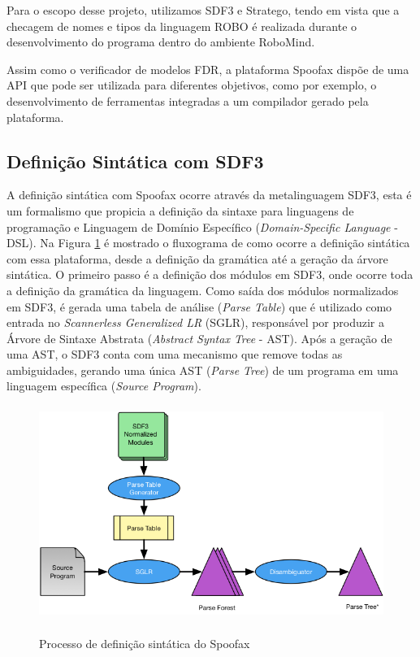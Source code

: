 Para o escopo desse projeto, utilizamos SDF3 e Stratego, tendo em vista que a checagem de nomes e tipos da linguagem ROBO é realizada durante o desenvolvimento do programa dentro do ambiente RoboMind. 

Assim como o verificador de modelos FDR, a plataforma Spoofax dispõe de uma API que pode ser utilizada para diferentes objetivos, como por exemplo, o desenvolvimento de ferramentas integradas a um compilador gerado pela plataforma.

\subsection{Definição Sintática com SDF3}

A definição sintática com Spoofax ocorre através da metalinguagem SDF3, esta é um formalismo que propicia a definição da sintaxe para linguagens de programação e Linguagem de Domínio Específico (\textit{Domain-Specific Language} - DSL). Na Figura \ref{fig:parsing} é mostrado o fluxograma de como ocorre a definição sintática com essa plataforma, desde a definição da gramática até a geração da árvore sintática. O primeiro passo é a definição dos módulos em SDF3, onde ocorre toda a definição da gramática da linguagem. Como saída dos módulos normalizados em SDF3, é gerada uma tabela de análise (\textit{Parse Table}) que é utilizado como entrada no \textit{Scannerless Generalized LR} (SGLR), responsável por produzir a Árvore de Sintaxe Abstrata (\textit{Abstract Syntax Tree} - AST). Após a geração de uma AST, o SDF3 conta com uma mecanismo que remove todas as ambiguidades, gerando uma única AST (\textit{Parse Tree}) de um programa em uma linguagem específica (\textit{Source Program}). 

\begin{figure}[h]
\centering
\caption{Processo de definição sintática do Spoofax}
\includegraphics[height=7cm]{figuras/parsing.png}
\label{fig:parsing}
\end{figure}

